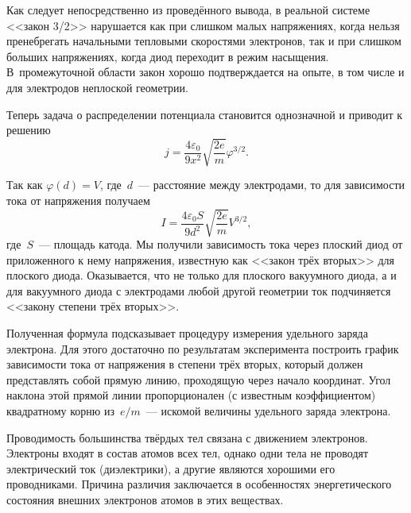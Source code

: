 Как следует непосредственно из проведённого вывода,
в реальной системе <<закон 3/2>> нарушается как при слишком малых напряжениях,
когда нельзя пренебрегать начальными тепловыми скоростями электронов,
так и при слишком больших напряжениях, когда диод переходит в режим насыщения.
В~промежуточной области закон хорошо подтверждается на опыте, в том числе
и для электродов неплоской геометрии.
\todo[inline,color=green]{<---}

Теперь задача о распределении потенциала становится однозначной и приводит к
решению
\begin{equation*}
	j=\frac{4\varepsilon_0}{9x^2}\sqrt{\frac{2e}{m}}\varphi^{3/2}.
\end{equation*}

Так как $\varphi(d)=V$, где~$d$~--- расстояние между электродами, то для
зависимости тока от напряжения получаем
\begin{equation*}
	I=\frac{4\varepsilon_0 S}{9d^2}\sqrt{\frac{2e}{m}}V^{3/2},
\end{equation*}
где~$S$~--- площадь катода. Мы получили зависимость тока через плоский диод от
приложенного к нему напряжения, известную как <<закон трёх вторых>> для плоского
диода. Оказывается, что не только для плоского вакуумного диода, а и для
вакуумного диода с электродами любой другой геометрии ток подчиняется <<закону
степени трёх вторых>>.

Полученная формула подсказывает процедуру измерения удельного заряда электрона.
Для этого достаточно по
результатам эксперимента построить график зависимости тока от напряжения в
степени трёх вторых, который должен
представлять собой прямую линию, проходящую через начало координат. Угол наклона
этой прямой линии пропорционален (с известным коэффициентом) квадратному корню
из~$e/m$~--- искомой величины удельного заряда электрона.
\todo[inline,color=cyan]{<---}


Проводимость большинства твёрдых тел связана с движением электронов. Электроны
входят в состав атомов всех тел, однако одни тела не проводят электрический ток
(диэлектрики), а другие являются хорошими его проводниками. Причина различия
заключается в особенностях энергетического состояния внешних электронов атомов в
этих веществах.

